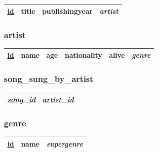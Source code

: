 \documentclass{article}
\begin{document}
\begin{tabularx}{9cm}{|X|X|m{3cm}|X|}
	\hline
	\underline{id} & title & publishingyear & \textit{artist} \\
	\hline
\end{tabularx}

\subsubsection*{artist}

\begin{tabularx}{13cm}{|X|X|X|m{3cm}|X|X|}
	\hline
	\underline{id} & name & age & nationality & alive & \textit{genre} \\
	\hline
\end{tabularx}

\subsubsection*{song\_sung\_by\_artist}

\begin{tabularx}{6cm}{|X|X|}
	\hline
	\underline{\textit{song\_id}} & \underline{\textit{artist\_id}} \\
	\hline
\end{tabularx}

\subsubsection*{genre}

\begin{tabularx}{7cm}{|X|X|m{3cm}|}
	\hline
	\underline{id} & name & \textit{supergenre} \\
	\hline
\end{tabularx}
\end{document}
